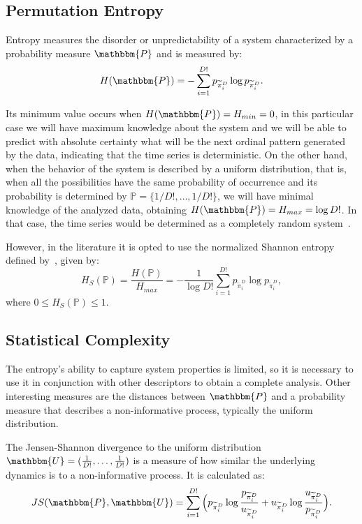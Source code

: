 \subsection{Permutation Entropy}

Entropy measures the disorder or unpredictability of a system characterized by a probability measure $\mathbbm{P}$ and is measured by:
\begin{equation}
H(\mathbbm{P}) = -\sum_{i = 1}^{D!} p_{\widetilde\pi^D_i} \log p_{\widetilde\pi^D_i} .
\label{eq:Entropia}
\end{equation}

Its minimum value occurs when $H (\mathbbm{P}) = H_{min} = 0$, in this particular case we will have maximum knowledge about the system and we will be able to predict with absolute certainty what will be the next ordinal pattern generated by the data, indicating that the time series is deterministic.
On the other hand, when the behavior of the system is described by a uniform distribution, that is, when all the possibilities have the same probability of occurrence and its probability is determined by $\mathbb{P} = \{1/D!, \dots, 1/D! \}$, we will have minimal knowledge of the analyzed data, obtaining $H(\mathbbm{P}) = H_{max} = \log D!$.
In that case, the time series would be determined as a completely random system~\citep{Bandt2002Permutation}.

However, in the literature it is opted to use the normalized Shannon entropy defined by~\cite{MARTIN2006439}, given by:
\begin{equation}
    H_S(\mathbb{P}) = \frac{H(\mathbb{P})}{H_{max}} = - \frac{1}{\log D!}\sum_{i = 1}^{D!} p_{\widetilde\pi^D_i} \log p_{\widetilde\pi^D_i},
\end{equation}
where $0 \leq H_S(\mathbb{P}) \leq 1$.

\subsection{Statistical Complexity}

The entropy's ability to capture system properties is limited, so it is necessary to use it in conjunction with other descriptors to obtain a complete analysis.
Other interesting measures are the distances between $\mathbbm{P}$ and a probability measure that describes a non-informative process, typically the uniform distribution.

The Jensen-Shannon divergence to the uniform distribution $\mathbbm{U} = (\frac{1}{D!}, \dots, \frac{1}{D!})$ is a measure of how similar the underlying dynamics is to a non-informative process.
It is calculated as:
\begin{equation}
    JS(\mathbbm{P}, \mathbbm{U}) = \sum_{i = 1}^{D!} \Big(p_{\widetilde\pi^D_i} \log\frac{p_{\widetilde\pi^D_i}}{u_{\widetilde\pi^D_i}} +
    u_{\widetilde\pi^D_i} \log\frac{u_{\widetilde\pi^D_i}}{p_{\widetilde\pi^D_i}}
    \Big).
\end{equation}

